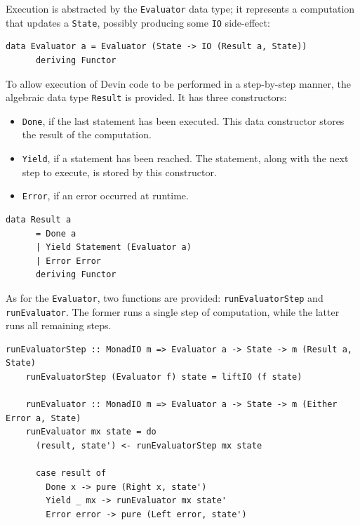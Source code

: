 \documentclass[UdineBachThesis,american,11pt]{PhdThesis}
\begin{document}
  \pagebreak

  Execution is abstracted by the \mbox{\texttt{Evaluator}} data type; it
  represents a computation that updates a \mbox{\texttt{State}}, possibly
  producing some \mbox{\texttt{IO}} side-effect:

  \begin{Verbatim}[gobble=4,fontsize=\small]
    data Evaluator a = Evaluator (State -> IO (Result a, State))
      deriving Functor
  \end{Verbatim}

  To allow execution of Devin code to be performed in a step-by-step manner, the
  algebraic data type \mbox{\texttt{Result}} is provided. It has three
  constructors:

  \begin{itemize}
    \item \mbox{\texttt{Done}}, if the last statement has been executed. This
    data constructor stores the result of the computation.

    \item \mbox{\texttt{Yield}}, if a statement has been reached. The statement,
    along with the next step to execute, is stored by this constructor.

    \item \mbox{\texttt{Error}}, if an error occurred at runtime.
  \end{itemize}

  \begin{Verbatim}[gobble=4,fontsize=\small]
    data Result a
      = Done a
      | Yield Statement (Evaluator a)
      | Error Error
      deriving Functor
  \end{Verbatim}

  As for the \mbox{\texttt{Evaluator}}, two functions are provided:
  \mbox{\texttt{runEvaluatorStep}} and \mbox{\texttt{runEvaluator}}. The former
  runs a single step of computation, while the latter runs all remaining steps.

  \begin{Verbatim}[gobble=4,fontsize=\small]
    runEvaluatorStep :: MonadIO m => Evaluator a -> State -> m (Result a, State)
    runEvaluatorStep (Evaluator f) state = liftIO (f state)

    runEvaluator :: MonadIO m => Evaluator a -> State -> m (Either Error a, State)
    runEvaluator mx state = do
      (result, state') <- runEvaluatorStep mx state

      case result of
        Done x -> pure (Right x, state')
        Yield _ mx -> runEvaluator mx state'
        Error error -> pure (Left error, state')
  \end{Verbatim}
\end{document}
